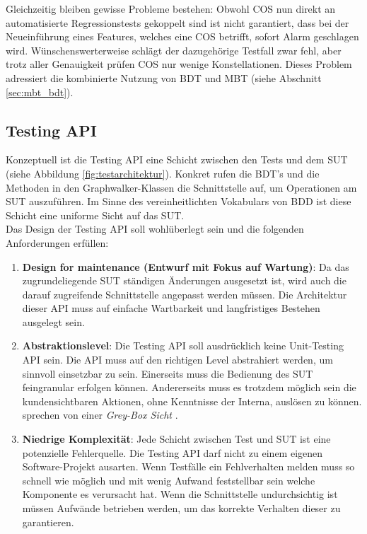 Gleichzeitig bleiben gewisse Probleme bestehen: Obwohl \Gls{COS} nun direkt an automatisierte Regressionstests gekoppelt sind ist nicht garantiert, dass bei der Neueinführung eines Features, welches eine \Gls{COS} betrifft, sofort Alarm geschlagen wird. Wünschenswerterweise schlägt der dazugehörige Testfall zwar fehl, aber trotz aller Genauigkeit prüfen \Gls{COS} nur wenige Konstellationen. Dieses Problem adressiert die kombinierte Nutzung von \Gls{BDT} und \Gls{MBT} (siehe Abschnitt \ref{sec:mbt_bdt}).

\subsection{Testing API}
\label{sec:testing_api}

Konzeptuell ist die Testing API eine Schicht zwischen den Tests und dem \Gls{SUT} (siehe Abbildung \ref{fig:testarchitektur}). Konkret rufen die \Gls{BDT}'s und die Methoden in den Graphwalker-Klassen die Schnittstelle auf, um Operationen am \Gls{SUT} auszuführen. Im Sinne des vereinheitlichten Vokabulars von \Gls{BDD} ist diese Schicht eine uniforme Sicht auf das \Gls{SUT}.\\
Das Design der Testing API soll wohlüberlegt sein und die folgenden Anforderungen erfüllen:

\begin{enumerate}
\item \textbf{Design for maintenance (Entwurf mit Fokus auf Wartung)}: Da das zugrundeliegende \Gls{SUT} ständigen Änderungen ausgesetzt ist, wird auch die darauf zugreifende Schnittstelle angepasst werden müssen. Die Architektur dieser API muss auf einfache Wartbarkeit und langfristiges Bestehen ausgelegt sein.
\item \textbf{Abstraktionslevel}: Die Testing API soll ausdrücklich keine Unit-Testing API sein. Die API muss auf den richtigen Level abstrahiert werden, um sinnvoll einsetzbar zu sein. Einerseits muss die Bedienung des \Gls{SUT} feingranular erfolgen können. Andererseits muss es trotzdem möglich sein die kundensichtbaren Aktionen, ohne Kenntnisse der Interna, auslösen zu können. \citeauthor{tyler_black-box_2004} sprechen von einer \textit{Grey-Box Sicht} \cite{tyler_black-box_2004}.
\item \textbf{Niedrige Komplexität}: Jede Schicht zwischen Test und \Gls{SUT} ist eine potenzielle Fehlerquelle. Die Testing API darf nicht zu einem eigenen Software-Projekt ausarten. Wenn Testfälle ein Fehlverhalten melden muss so schnell wie möglich und mit wenig Aufwand feststellbar sein welche Komponente es verursacht hat. Wenn die Schnittstelle undurchsichtig ist müssen Aufwände betrieben werden, um das korrekte Verhalten dieser zu garantieren.
\end{enumerate}

